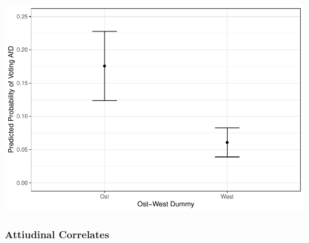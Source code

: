\documentclass[
]{article}
\begin{document}
\includegraphics{AVCD_Final_Assignment-Edenhofer_latest_files/figure-latex/afd-ost-west-1.pdf}

\hypertarget{attiudinal-correlates}{%
\subsubsection{Attiudinal Correlates}\label{attiudinal-correlates}}
\end{document}
